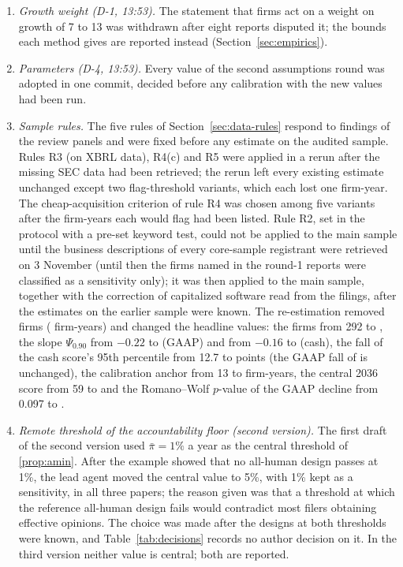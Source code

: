 \begin{enumerate}[leftmargin=*,itemsep=0pt,topsep=2pt]
\item \emph{Growth weight (D-1, 13:53).} The statement that firms act on a weight on growth of 7 to 13 was withdrawn after eight reports disputed it; the bounds each method gives are reported instead (Section~\ref{sec:empirics}).
\item \emph{Parameters (D-4, 13:53).} Every value of the second assumptions round was adopted in one commit, decided before any calibration with the new values had been run.
\item \emph{Sample rules.} The five rules of Section~\ref{sec:data-rules} respond to findings of the review panels and were fixed before any estimate on the audited sample. Rules R3 (on XBRL data), R4(c) and R5 were applied in a rerun after the missing SEC data had been retrieved; the rerun left every existing estimate unchanged except two flag-threshold variants, which each lost one firm-year. The cheap-acquisition criterion of rule R4 was chosen among five variants after the firm-years each would flag had been listed. Rule R2, set in the protocol with a pre-set keyword test, could not be applied to the main sample until the business descriptions of every core-sample registrant were retrieved on 3 November (until then the \VRtwoFirms{} firms named in the round-1 reports were classified as a sensitivity only); it was then applied to the main sample, together with the correction of capitalized software read from the filings, after the estimates on the earlier sample were known. The re-estimation removed \VRtwoExclFirms{} firms (\VRtwoExclN{} firm-years) and changed the headline values: the firms from 292 to \VFirmsEone, the slope $\Psi_{0.90}$ from $-0.22$ to \PsiOpEone{} (GAAP) and from $-0.16$ to \PsiCashEone{} (cash), the fall of the cash score's 95th percentile from 12.7 to \TopFallCashEone{} points (the GAAP fall of \TopFallOpEone{} is unchanged), the calibration anchor from 13 to \AnchorN{} firm-years, the central 2036 score from 59 to \CenRSix{} and the Romano--Wolf $p$-value of the GAAP decline from 0.097 to \HolmTopRW.
\item \emph{Remote threshold of the accountability floor (second version).} The first draft of the second version used $\bar\pi=1\%$ a year as the central threshold of \autoref{prop:amin}. After the example showed that no all-human design passes at 1\%, the lead agent moved the central value to 5\%, with 1\% kept as a sensitivity, in all three papers; the reason given was that a threshold at which the reference all-human design fails would contradict most filers obtaining effective opinions. The choice was made after the designs at both thresholds were known, and Table~\ref{tab:decisions} records no author decision on it. In the third version neither value is central; both are reported.

\end{enumerate}
